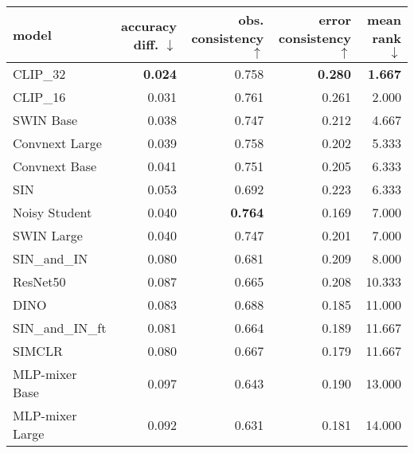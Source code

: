 \begin{tabular}{lrrrr}
\toprule
           model & accuracy diff. $\downarrow$ & obs. consistency $\uparrow$ & error consistency $\uparrow$ & mean rank $\downarrow$ \\
\midrule
        CLIP\_32 &              \textbf{0.024} &                       0.758 &               \textbf{0.280} &         \textbf{1.667} \\
        CLIP\_16 &                       0.031 &                       0.761 &                        0.261 &                  2.000 \\
       SWIN Base &                       0.038 &                       0.747 &                        0.212 &                  4.667 \\
  Convnext Large &                       0.039 &                       0.758 &                        0.202 &                  5.333 \\
   Convnext Base &                       0.041 &                       0.751 &                        0.205 &                  6.333 \\
             SIN &                       0.053 &                       0.692 &                        0.223 &                  6.333 \\
   Noisy Student &                       0.040 &              \textbf{0.764} &                        0.169 &                  7.000 \\
      SWIN Large &                       0.040 &                       0.747 &                        0.201 &                  7.000 \\
    SIN\_and\_IN &                       0.080 &                       0.681 &                        0.209 &                  8.000 \\
        ResNet50 &                       0.087 &                       0.665 &                        0.208 &                 10.333 \\
            DINO &                       0.083 &                       0.688 &                        0.185 &                 11.000 \\
SIN\_and\_IN\_ft &                       0.081 &                       0.664 &                        0.189 &                 11.667 \\
          SIMCLR &                       0.080 &                       0.667 &                        0.179 &                 11.667 \\
  MLP-mixer Base &                       0.097 &                       0.643 &                        0.190 &                 13.000 \\
 MLP-mixer Large &                       0.092 &                       0.631 &                        0.181 &                 14.000 \\
\bottomrule
\end{tabular}

